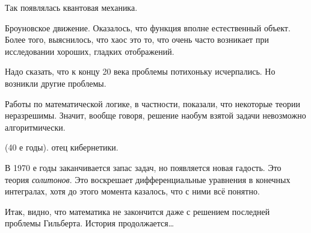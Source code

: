 \documentclass[a4paper,oneside,fleqn,10pt]{article}
\begin{document}
Так появлялась квантовая механика.

Броуновское движение. Оказалось, что функция  вполне естественный объект.
Более того, выяснилось, что хаос это то, что очень часто возникает при исследовании
хороших, гладких отображений.

Надо сказать, что к концу 20 века проблемы  потихоньку исчерпались.
Но возникли другие проблемы.

Работы по математической логике, в частности, показали, что
некоторые теории неразрешимы. Значит, вообще говоря, решение наобум взятой задачи
невозможно алгоритмически.

 (40 е годы).  отец кибернетики.

В 1970 е годы заканчивается запас задач, но появляется новая гадость. Это теория \emph{солитонов}.
Это воскрешает дифференциальные уравнения в конечных интегралах, хотя до этого момента
казалось, что с ними всё понятно.

Итак, видно, что математика не закончится даже с решением последней проблемы Гильберта. История продолжается\ldots

\tbk

\newpage
\scriptsize
\end{document}
